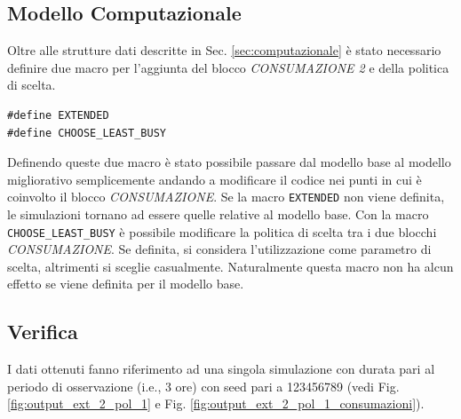 \documentclass{article}
\begin{document}
\subsection{Modello Computazionale}
Oltre alle strutture dati descritte in Sec. \ref{sec:computazionale} è stato necessario definire due macro per l'aggiunta del blocco \textit{CONSUMAZIONE 2} e della politica di scelta.
\begin{lstlisting}
#define EXTENDED
#define CHOOSE_LEAST_BUSY
\end{lstlisting}
Definendo queste due macro è stato possibile passare dal modello base al modello migliorativo semplicemente andando a modificare il codice nei punti in cui è coinvolto il blocco \textit{CONSUMAZIONE}. 
Se la macro \texttt{EXTENDED} non viene definita, le simulazioni tornano ad essere quelle relative al modello base. Con la macro \texttt{CHOOSE\_LEAST\_BUSY} è possibile modificare la politica di scelta tra i due blocchi \textit{CONSUMAZIONE}. Se definita, si  considera l'utilizzazione come parametro di scelta, altrimenti si sceglie casualmente. Naturalmente questa macro non ha alcun effetto se viene definita per il modello base.
\subsection{Verifica}
I dati ottenuti fanno riferimento ad una singola simulazione con durata pari al periodo di osservazione (i.e.,  3 ore) con seed pari a 123456789 (vedi Fig. \ref{fig:output_ext_2_pol_1} e Fig. \ref{fig:output_ext_2_pol_1_consumazioni}).
\end{document}
